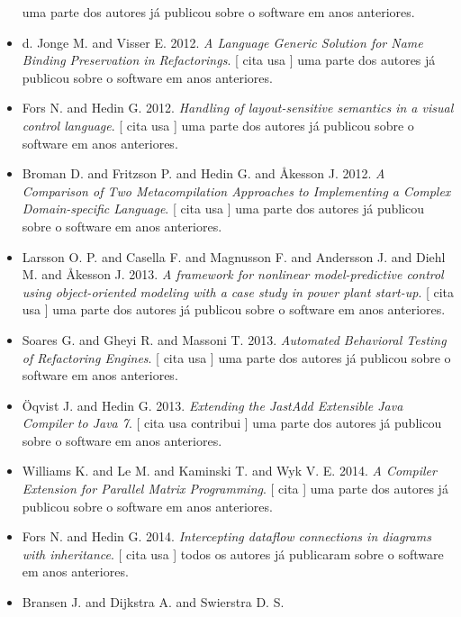 \begin{itemize}
uma parte dos autores já publicou sobre o software em anos anteriores.
\item d. Jonge M. and Visser E.
      2012.
        \textit{ A Language Generic Solution for Name Binding Preservation in Refactorings}.
      [
          cita
          usa
      ]
uma parte dos autores já publicou sobre o software em anos anteriores.
\item Fors N. and Hedin G.
      2012.
        \textit{ Handling of layout-sensitive semantics in a visual control language}.
      [
          cita
          usa
      ]
uma parte dos autores já publicou sobre o software em anos anteriores.
\item Broman D. and Fritzson P. and Hedin G. and Åkesson J.
      2012.
        \textit{ A Comparison of Two Metacompilation Approaches to Implementing a Complex Domain-specific Language}.
      [
          cita
          usa
      ]
uma parte dos autores já publicou sobre o software em anos anteriores.
\item Larsson O. P. and Casella F. and Magnusson F. and Andersson J. and Diehl M. and Åkesson J.
      2013.
        \textit{ A framework for nonlinear model-predictive control using object-oriented modeling with a case study in power plant start-up}.
      [
          cita
          usa
      ]
uma parte dos autores já publicou sobre o software em anos anteriores.
\item Soares G. and Gheyi R. and Massoni T.
      2013.
        \textit{ Automated Behavioral Testing of Refactoring Engines}.
      [
          cita
          usa
      ]
uma parte dos autores já publicou sobre o software em anos anteriores.
\item \"{O}qvist J. and Hedin G.
      2013.
        \textit{ Extending the JastAdd Extensible Java Compiler to Java 7}.
      [
          cita
          usa
          contribui
      ]
uma parte dos autores já publicou sobre o software em anos anteriores.
\item Williams K. and Le M. and Kaminski T. and Wyk V. E.
      2014.
        \textit{ A Compiler Extension for Parallel Matrix Programming}.
      [
          cita
      ]
uma parte dos autores já publicou sobre o software em anos anteriores.
\item Fors N. and Hedin G.
      2014.
        \textit{ Intercepting dataflow connections in diagrams with inheritance}.
      [
          cita
          usa
      ]
todos os autores já publicaram sobre o software em anos anteriores.
\item Bransen J. and Dijkstra A. and Swierstra D. S.

\end{itemize}
